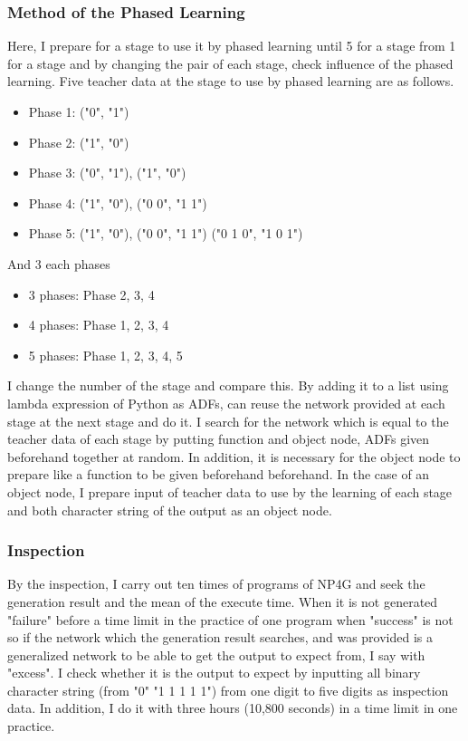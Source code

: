 \documentclass{article}
\begin{document}
\subsubsection {Method of the Phased Learning}
\label{sec:PLhow}
Here, I prepare for a stage to use it by phased learning until 5 for a stage from 1 for a stage and by changing the pair of each stage, check influence of the phased learning.
Five teacher data at the stage to use by phased learning are as follows.

\begin{itemize}
\item Phase 1: ("0", "1")
\item Phase 2: ("1", "0")
\item Phase 3: ("0", "1"), ("1", "0")
\item Phase 4: ("1", "0"), ("0 0", "1 1")
\item Phase 5: ("1", "0"), ("0 0", "1 1") ("0 1 0", "1 0 1")
\end{itemize}

And 3 each phases
\begin{itemize}
\item 3 phases:
Phase 2, 3, 4
\item 4 phases:
Phase 1, 2, 3, 4
\item 5 phases:
Phase 1, 2, 3, 4, 5
\end{itemize}
\noindent

I change the number of the stage and compare this.
By adding it to a list using lambda expression of Python as ADFs, can reuse the network provided at each stage at the next stage and do it.
I search for the network which is equal to the teacher data of each stage by putting function and object node, ADFs given beforehand together at random.
In addition, it is necessary for the object node to prepare like a function to be given beforehand beforehand.
In the case of an object node, I prepare input of teacher data to use by the learning of each stage and both character string of the output as an object node.

\subsubsection {Inspection}
By the inspection, I carry out ten times of programs of NP4G and seek the generation result and the mean of the execute time.
When it is not generated "failure" before a time limit in the practice of one program when "success" is not so if the network which the generation result searches, and was provided is a generalized network to be able to get the output to expect from, I say with "excess".
I check whether it is the output to expect by inputting all binary character string (from "0" "1 1 1 1 1") from one digit to five digits as inspection data.
In addition, I do it with three hours (10,800 seconds) in a time limit in one practice.
\end{document}

